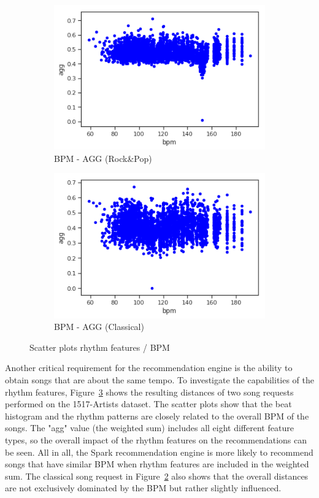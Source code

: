 \begin{figure}[htbp]
{{			\begin{subfigure}{.495\textwidth}
				\centering			
				\includegraphics[scale=0.5]{Images/SparkFeat/bpm_agg_hip.png}	
				\caption{BPM - AGG (Rock\&Pop)}
				\label{fig:arbpm}
			\end{subfigure}		
			\begin{subfigure}{.495\textwidth}
				\centering			
				\includegraphics[scale=0.5]{Images/SparkFeat/bpm_agg_clas.png}	
				\caption{BPM - AGG (Classical)}
				\label{fig:acbpm}
			\end{subfigure}%
	}}
	\caption{Scatter plots rhythm features / BPM}
	\label{fig:rhythmfeat}
\end{figure}
\FloatBarrier

\noindent Another critical requirement for the recommendation engine is the ability to obtain songs that are about the same tempo. To investigate the capabilities of the rhythm features, Figure~\ref{fig:rhythmfeat} shows the resulting distances of two song requests performed on the 1517-Artists dataset.
\noindent The scatter plots show that the beat histogram and the rhythm patterns are closely related to the overall BPM of the songs. The "agg" value (the weighted sum) includes all eight different feature types, so the overall impact of the rhythm features on the recommendations can be seen. All in all, the Spark recommendation engine is more likely to recommend songs that have similar BPM when rhythm features are included in the weighted sum. The classical song request in Figure~\ref{fig:acbpm} also shows that the overall distances are not exclusively dominated by the BPM but rather slightly influenced. 

